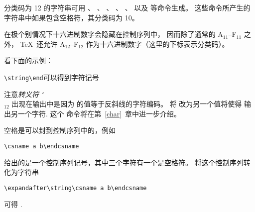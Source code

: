 \documentclass{book}
\begin{document}
分类码为 12 的字符串可用
、
、
、
、
、
以及  等命令生成。
这些命令所产生的字符串中如果包含空格符，其分类码为 10。

在极个别情况下十六进制数字会隐藏在控制序列中，
因而除了通常的 \n A$_{11}$--\n F$_{11}$ 之外，
\TeX\ 还允许 \n A$_{12}$--\n F$_{12}$ 作为十六进制数字（这里的下标表示分类码）。

看下面的示例：
\begin{disp}\verb>\string\end>\quad 可以得到字符记号 \quad
{} \end{disp}
注意{\em 转义符} \texttt{\char`\\}$_{12}$\label{use:escape}
出现在输出中是因为  的值等于反斜线的字符编码。
将  改为另一个值将使得  输出另一个字符.
这个  命令将在第~\ref{char}~章中进一步介绍。

空格是可以封到控制序列中的，例如
\begin{disp}\verb>\csname a b\endcsname>\end{disp}
给出的是一个控制序列记号，其中三个字符有一个是空格符。
将这个控制序列转化为字符串
\begin{disp}\verb>\expandafter\string\csname a b\endcsname>\end{disp}
可得 .
\end{document}
